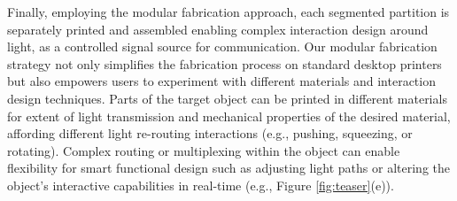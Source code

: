 Finally, employing the modular fabrication approach, each segmented partition is separately printed and assembled 
enabling complex interaction design around light, as a controlled signal source for communication. %
Our modular fabrication strategy not only 
simplifies the fabrication process on standard desktop printers but also empowers users to experiment with different materials and interaction design techniques.
Parts of the target object can be printed in different materials for extent of light transmission and mechanical properties of the desired material, 
affording different light re-routing interactions (e.g., pushing, squeezing, or rotating). %
Complex routing or multiplexing within the object %
can enable flexibility for smart functional design 
such as adjusting light paths or altering the object's interactive capabilities in real-time (e.g., Figure \ref{fig:teaser}(e)). 
